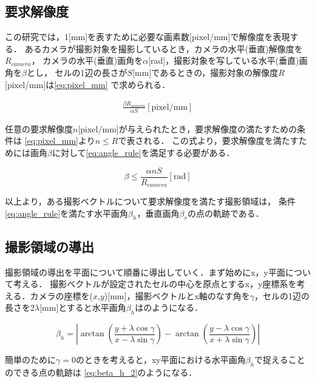 \documentclass[autodetect-engine,dvipdfmx-if-dvi,ja=standard,a4j,jbase=11pt,magstyle=nomag*]{bxjsreport}
\begin{document}
\subsection{要求解像度}
この研究では，1[mm]を表すために必要な画素数[pixel/mm]で解像度を表現する．
あるカメラが撮影対象を撮影しているとき，カメラの水平(垂直)解像度を$R_{camera}$，
カメラの水平(垂直)画角を$\alpha$[rad]，撮影対象を写している水平(垂直)画角を$\beta$とし，
セルの1辺の長さが$S$[mm]であるときの，撮影対象の解像度$R$[pixel/mm]は\cref{eq:pixel_mm}
で求められる．

\begin{equation}
    \label{eq:pixel_mm}
    \begin{aligned}
        \frac{\beta R_{camera}}{\alpha S}\mathrm{[pixel/mm]}
    \end{aligned}
\end{equation}

任意の要求解像度$n$[pixel/mm]が与えられたとき，要求解像度の満たすための条件は
\cref{eq:pixel_mm}より$n \le R$で表される．
この式より，要求解像度を満たすためには画角$\beta$に対して\cref{eq:angle_rule}を満足する必要がある．

\begin{equation}
\beta \le \frac{\alpha n S}{R_{camera}}\mathrm{[rad]}
\label{eq:angle_rule}
\end{equation}

以上より，ある撮影ベクトルについて要求解像度を満たす撮影領域は，
条件\cref{eq:angle_rule}を満たす水平画角$\beta_h$，垂直画角$\beta_v$の点の軌跡である．

\subsection{撮影領域の導出}
撮影領域の導出を平面について順番に導出していく．まず始めにx，y平面について考える．
撮影ベクトルが設定されたセルの中心を原点とするx，y座標系を考える．カメラの座標を($x$,$y$)[mm]，撮影ベクトルとx軸のなす角を$\gamma$，セルの1辺の長さを2$\lambda$[mm]とすると水平画角$\beta_h$はのようになる．

\begin{equation}
\beta_{h}=\left|\arctan \left(\frac{y+\lambda \cos \gamma}{x-\lambda \sin \gamma}\right)-
               \arctan \left(\frac{y-\lambda \cos \gamma}{x+\lambda \sin \gamma}\right)\right|
\label{eq:beta_h_1}
\end{equation}

簡単のために$\gamma=0$のときを考えると，xy平面における水平画角$\beta_h$で捉えることのできる点の軌跡は
\cref{eq:beta_h_2}のようになる．
\end{document}
